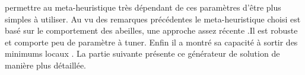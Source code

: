 permettre au meta-heuristique très dépendant de ces paramètres d’être plus simples
à utiliser.
Au vu des remarques précédentes le meta-heuristique choisi est basé sur le
comportement des abeilles, une approche assez récente .Il est
robuste  et comporte peu de paramètre à tuner. Enfin il
a montré sa capacité à sortir des minimums locaux .
La partie suivante présente ce générateur de solution de manière plus détaillée.

